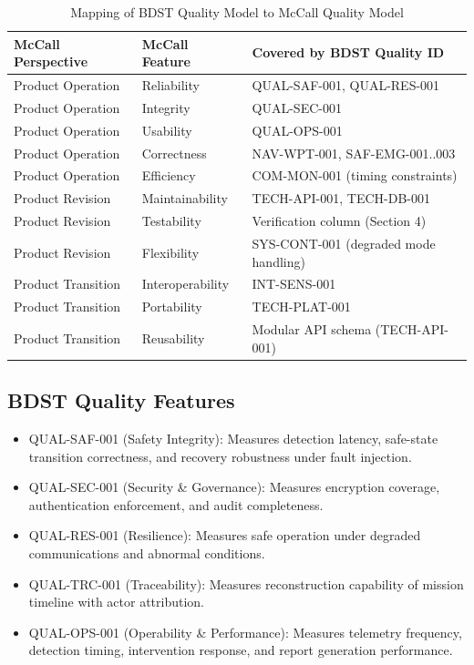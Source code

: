 \documentclass[11pt,a4paper]{article}
\begin{document}
\begin{table}[h]
\centering
\begin{tabular}{|l|l|l|}
\hline
McCall Perspective & McCall Feature & Covered by BDST Quality ID \\ \hline
Product Operation & Reliability & QUAL-SAF-001, QUAL-RES-001 \\
Product Operation & Integrity & QUAL-SEC-001 \\
Product Operation & Usability & QUAL-OPS-001 \\
Product Operation & Correctness & NAV-WPT-001, SAF-EMG-001..003 \\
Product Operation & Efficiency & COM-MON-001 (timing constraints) \\ \hline
Product Revision & Maintainability & TECH-API-001, TECH-DB-001 \\
Product Revision & Testability & Verification column (Section 4) \\
Product Revision & Flexibility & SYS-CONT-001 (degraded mode handling) \\ \hline
Product Transition & Interoperability & INT-SENS-001 \\
Product Transition & Portability & TECH-PLAT-001 \\
Product Transition & Reusability & Modular API schema (TECH-API-001) \\ \hline
\end{tabular}
\caption{Mapping of BDST Quality Model to McCall Quality Model}
\label{tab:mccall-quality-model}
\end{table}

\subsection{BDST Quality Features}

\begin{itemize}
\item QUAL-SAF-001 (Safety Integrity): Measures detection latency, safe-state transition correctness, and recovery robustness under fault injection.
\item QUAL-SEC-001 (Security \& Governance): Measures encryption coverage, authentication enforcement, and audit completeness.
\item QUAL-RES-001 (Resilience): Measures safe operation under degraded communications and abnormal conditions.
\item QUAL-TRC-001 (Traceability): Measures reconstruction capability of mission timeline with actor attribution.
\item QUAL-OPS-001 (Operability \& Performance): Measures telemetry frequency, detection timing, intervention response, and report generation performance.
\end{itemize}
\end{document}
